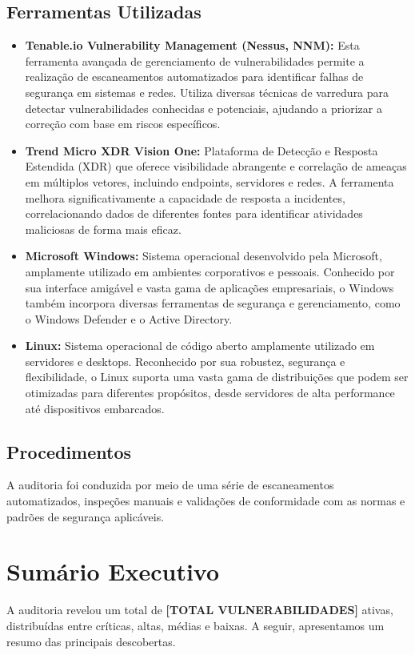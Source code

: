 \documentclass[a4paper,12pt]{article}
\begin{document}
\subsection{Ferramentas Utilizadas}
\begin{itemize}
    \item \textbf{Tenable.io Vulnerability Management (Nessus, NNM):} Esta ferramenta avançada de gerenciamento de vulnerabilidades permite a realização de escaneamentos automatizados para identificar falhas de segurança em sistemas e redes. Utiliza diversas técnicas de varredura para detectar vulnerabilidades conhecidas e potenciais, ajudando a priorizar a correção com base em riscos específicos.
    \item \textbf{Trend Micro XDR Vision One:} Plataforma de Detecção e Resposta Estendida (XDR) que oferece visibilidade abrangente e correlação de ameaças em múltiplos vetores, incluindo endpoints, servidores e redes. A ferramenta melhora significativamente a capacidade de resposta a incidentes, correlacionando dados de diferentes fontes para identificar atividades maliciosas de forma mais eficaz.
    \item \textbf{Microsoft Windows:} Sistema operacional desenvolvido pela Microsoft, amplamente utilizado em ambientes corporativos e pessoais. Conhecido por sua interface amigável e vasta gama de aplicações empresariais, o Windows também incorpora diversas ferramentas de segurança e gerenciamento, como o Windows Defender e o Active Directory.
    \item \textbf{Linux:} Sistema operacional de código aberto amplamente utilizado em servidores e desktops. Reconhecido por sua robustez, segurança e flexibilidade, o Linux suporta uma vasta gama de distribuições que podem ser otimizadas para diferentes propósitos, desde servidores de alta performance até dispositivos embarcados.
\end{itemize}

\subsection{Procedimentos}
A auditoria foi conduzida por meio de uma série de escaneamentos automatizados, inspeções manuais e validações de conformidade com as normas e padrões de segurança aplicáveis.

\section{Sumário Executivo}
A auditoria revelou um total de \textbf{[TOTAL VULNERABILIDADES]} ativas, distribuídas entre críticas, altas, médias e baixas. A seguir, apresentamos um resumo das principais descobertas.
\end{document}
